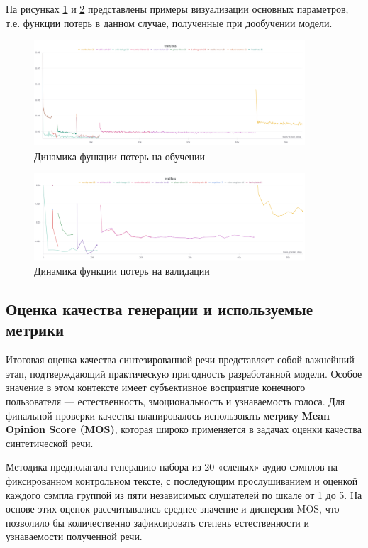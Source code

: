 На рисунках \ref{fig:loss_curve1} и \ref{fig:loss_curve2} представлены примеры визуализации 
основных параметров, т.е. функции потерь в данном случае, полученные при дообучении модели.

\begin{figure}[h]
  \centering
  \includegraphics[width=0.9\textwidth]{images/wandb-train-loss.png}
  \caption{Динамика функции потерь на обучении}
  \label{fig:loss_curve1}
\end{figure}

\begin{figure}[h]
  \centering
  \includegraphics[width=0.9\textwidth]{images/wandb-eval-loss.png}
  \caption{Динамика функции потерь на валидации}
  \label{fig:loss_curve2}
\end{figure}


\subsection{Оценка качества генерации и используемые метрики}

Итоговая оценка качества синтезированной речи представляет собой важнейший этап, подтверждающий практическую пригодность разработанной модели. Особое значение в этом контексте имеет субъективное восприятие конечного пользователя — естественность, эмоциональность и узнаваемость голоса. Для финальной проверки качества планировалось использовать метрику \textbf{Mean Opinion Score (MOS)}, которая широко применяется в задачах оценки качества синтетической речи.

Методика предполагала генерацию набора из 20 «слепых» аудио-сэмплов на фиксированном контрольном тексте, с последующим прослушиванием и оценкой каждого сэмпла группой из пяти независимых слушателей по шкале от 1 до 5. На основе этих оценок рассчитывались среднее значение и дисперсия MOS, что позволило бы количественно зафиксировать степень естественности и узнаваемости полученной речи.

